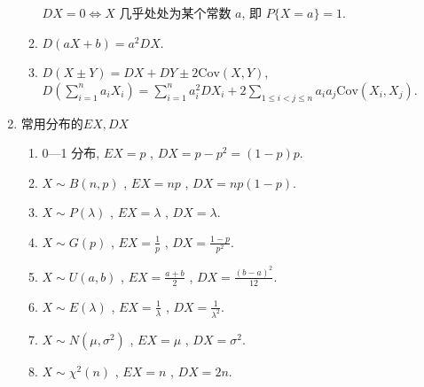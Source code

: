 \begin{enumerate}
\begin{enumerate}
                        $DX = 0 \Leftrightarrow X$ 几乎处处为某个常数 $a$, 即 $P\{X = a\} = 1$.
                  \item $D(aX + b) = a^2DX$.
                  \item $D(X \pm Y) = DX + DY \pm 2\text{Cov}(X, Y)$, $D\left(\sum_{i=1}^{n} a_i X_i\right) = \sum_{i=1}^{n} a_i^2 DX_i + 2 \sum_{1 \leqslant i < j \leqslant n} a_i a_j \text{Cov}(X_i, X_j)$.
            \end{enumerate}
      \item 常用分布的$EX,DX$
            \begin{enumerate}
                  \item 0—1 分布, $EX=p$ , $DX=p-p^{2}=(1-p)p$.
                  \item $X \sim B(n, p)$ , $EX=np$ , $DX=np(1-p)$.
                  \item $X \sim P(\lambda)$ , $EX=\lambda$ , $DX=\lambda$.
                  \item $X \sim G(p)$ , $EX=\frac{1}{p}$ , $DX=\frac{1-p}{p^{2}}$.
                  \item $X \sim U(a, b)$ , $EX=\frac{a+b}{2}$ , $DX=\frac{(b-a)^{2}}{12}$.
                  \item $X \sim E(\lambda)$ , $EX=\frac{1}{\lambda}$ , $DX=\frac{1}{\lambda^{2}}$.
                  \item $X \sim N(\mu, \sigma^{2})$ , $EX=\mu$ , $DX=\sigma^{2}$.
                  \item $X \sim \chi^{2}(n)$ , $EX=n$ , $DX=2n$.
            \end{enumerate}
\end{enumerate}
